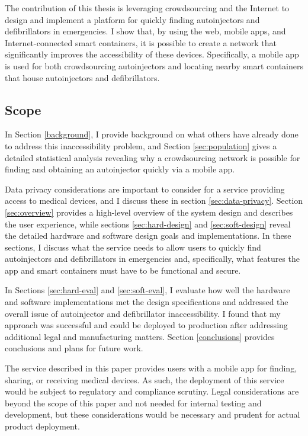 The contribution of this thesis is leveraging crowdsourcing and the Internet to design and implement a platform for quickly finding autoinjectors and defibrillators in emergencies. I show that, by using the web, mobile apps, and Internet-connected smart containers, it is possible to create a network that significantly improves the accessibility of these devices. Specifically, a mobile app is used for both crowdsourcing autoinjectors and locating nearby smart containers that house autoinjectors and defibrillators. 

\subsection{Scope}

In Section \ref{background}, I provide background on what others have already done to address this inaccessibility problem, and Section \ref{sec:population} gives a detailed statistical analysis revealing why a crowdsourcing network is possible for finding and obtaining an autoinjector quickly via a mobile app.

Data privacy considerations are important to consider for a service providing access to medical devices, and I discuss these in section \ref{sec:data-privacy}. Section \ref{sec:overview} provides a high-level overview of the system design and describes the user experience, while sections \ref{sec:hard-design} and \ref{sec:soft-design} reveal the detailed hardware and software design goals and implementations. In these sections, I discuss what the service needs to allow users to quickly find autoinjectors and defibrillators in emergencies and, specifically, what features the app and smart containers must have to be functional and secure.

In Sections \ref{sec:hard-eval} and \ref{sec:soft-eval}, I evaluate how well the hardware and software implementations met the design specifications and addressed the overall issue of autoinjector and defibrillator inaccessibility. I found that my approach was successful and could be deployed to production after addressing additional legal and manufacturing matters. Section \ref{conclusions} provides conclusions and plans for future work. 

The service described in this paper provides users with a mobile app for finding, sharing, or receiving medical devices. As such, the deployment of this service would be subject to regulatory and compliance scrutiny. Legal considerations are beyond the scope of this paper and not needed for internal testing and development, but these considerations would be necessary and prudent for actual product deployment.

